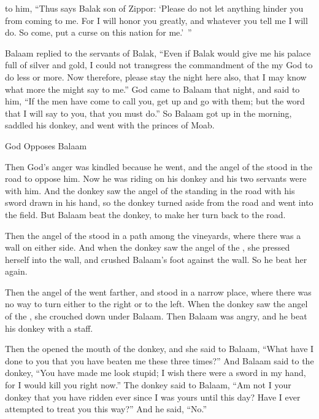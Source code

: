 {to him, “Thus
says
Balak
son
of Zippor: ‘Please do not
let
anything hinder
you from coming
to me.
For
I
will honor
you greatly,
and whatever
you tell
me
I will do.
So come,
put a curse
on this
nation for me.’ ”
\par }{\PP {}Balaam
replied
to
the servants
of Balak,
“Even if
Balak
would give
me his palace
full
of silver
and gold,
I could
not
transgress
the commandment
of the {}
my God
to do
less
or
more.
Now
therefore, please
stay
the night
here
also,
that I may
know
what
more
the {}
might say
to me.”
God
came
to
Balaam
that night,
and said
to him, “If
the men
have come
to call
you, get
up and go
with
them; but
the
word
that
I will say
to
you, that you must do.”
So Balaam
got
up in the morning,
saddled
his donkey,
and went
with
the princes
of Moab.
\par }{\SH God Opposes Balaam
\par }{\PP {}Then God’s
anger
was kindled
because
he went,
and the angel
of the {}
stood
in the road
to oppose
him. Now he
was riding
on
his donkey
and his two
servants
were with him.
And the donkey
saw
the
angel
of the {}
standing
in the road
with his sword
drawn
in his hand,
so the donkey
turned aside
from
the road
and went
into the field.
But
Balaam
beat
the donkey,
to make her turn
back to the road.
\par }{\PP {}Then the angel
of the {}
stood
in a path
among the vineyards,
where there was a wall
on either
side.
And when the donkey
saw
the angel
of the {}, she pressed
herself into
the wall,
and crushed
Balaam’s
foot
against the wall.
So he beat
her again.
\par }{\PP {}Then
the angel
of the {}
went farther,
and stood
in a narrow
place,
where
there was no
way
to turn
either to the right
or to the left.
When the donkey
saw
the angel
of the {}, she crouched down
under
Balaam.
Then Balaam
was angry,
and he
beat
his donkey
with a staff.
\par }{\PP {}Then the
{}
opened
the
mouth
of the donkey,
and she said
to Balaam,
“What
have I done
to you that
you have beaten
me these
three
times?”
And Balaam
said
to the donkey,
“You have made me look stupid;
I wish
there
were a sword
in my hand,
for
I would kill
you right now.”
The donkey
said
to
Balaam,
“Am not
I
your donkey
that
you have ridden
ever since I was
yours until
this
day? Have
I ever
attempted
to treat
you this
way?” And he said,
“No.”
}
